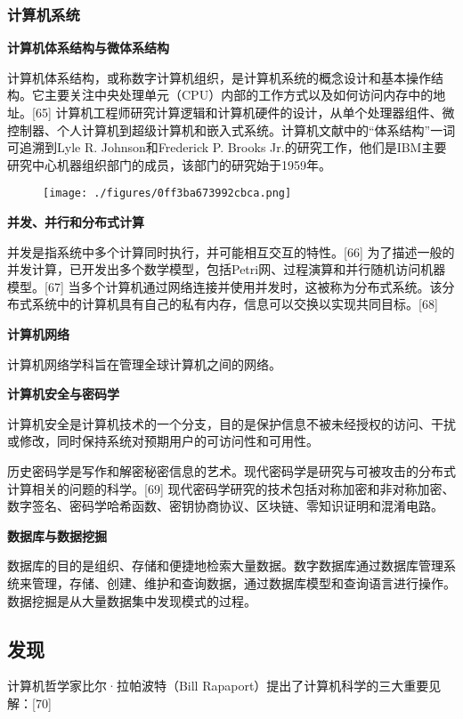 \subsubsection{计算机系统}  
\textbf{计算机体系结构与微体系结构 } 
 
计算机体系结构，或称数字计算机组织，是计算机系统的概念设计和基本操作结构。它主要关注中央处理单元（CPU）内部的工作方式以及如何访问内存中的地址。[65] 计算机工程师研究计算逻辑和计算机硬件的设计，从单个处理器组件、微控制器、个人计算机到超级计算机和嵌入式系统。计算机文献中的“体系结构”一词可追溯到Lyle R. Johnson和Frederick P. Brooks Jr.的研究工作，他们是IBM主要研究中心机器组织部门的成员，该部门的研究始于1959年。
\begin{figure}[ht]
\centering
\texttt{[image: ./figures/0ff3ba673992cbca.png]}
\caption{} \label{fig_JSS_13}
\end{figure}
\textbf{并发、并行和分布式计算 } 
 
并发是指系统中多个计算同时执行，并可能相互交互的特性。[66] 为了描述一般的并发计算，已开发出多个数学模型，包括Petri网、过程演算和并行随机访问机器模型。[67] 当多个计算机通过网络连接并使用并发时，这被称为分布式系统。该分布式系统中的计算机具有自己的私有内存，信息可以交换以实现共同目标。[68]  

\textbf{计算机网络}  
  
计算机网络学科旨在管理全球计算机之间的网络。  

\textbf{计算机安全与密码学}  
  
计算机安全是计算机技术的一个分支，目的是保护信息不被未经授权的访问、干扰或修改，同时保持系统对预期用户的可访问性和可用性。  

历史密码学是写作和解密秘密信息的艺术。现代密码学是研究与可被攻击的分布式计算相关的问题的科学。[69] 现代密码学研究的技术包括对称加密和非对称加密、数字签名、密码学哈希函数、密钥协商协议、区块链、零知识证明和混淆电路。  

\textbf{数据库与数据挖掘}  

数据库的目的是组织、存储和便捷地检索大量数据。数字数据库通过数据库管理系统来管理，存储、创建、维护和查询数据，通过数据库模型和查询语言进行操作。数据挖掘是从大量数据集中发现模式的过程。
\subsection{发现}  
计算机哲学家比尔·拉帕波特（Bill Rapaport）提出了计算机科学的三大重要见解：[70]

